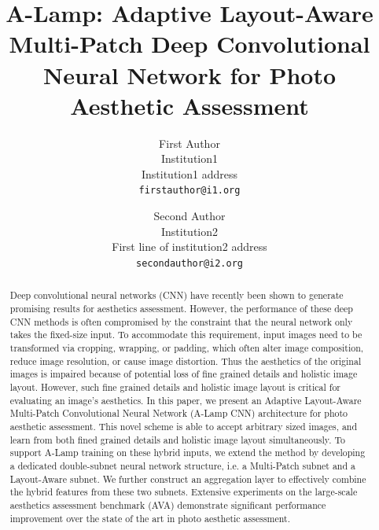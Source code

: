 \documentclass[10pt,twocolumn,letterpaper]{article}
\begin{document}
\title{A-Lamp: Adaptive Layout-Aware Multi-Patch Deep Convolutional Neural Network for Photo Aesthetic Assessment}

\author{First Author\\
Institution1\\
Institution1 address\\
{\tt\small firstauthor@i1.org}
\and
Second Author\\
Institution2\\
First line of institution2 address\\
{\tt\small secondauthor@i2.org}
}

\maketitle
\begin{abstract}	
		
Deep convolutional neural networks (CNN) have recently been shown to generate promising results for aesthetics assessment. However, the performance of these deep CNN methods is often compromised by the constraint that the neural network only takes the fixed-size input. To accommodate this requirement, input images need to be transformed via cropping, wrapping, or padding, which often alter image composition, reduce image resolution, or cause image distortion. Thus the aesthetics of the original images is impaired because of potential loss of fine grained details and holistic image layout. However, such fine grained details and holistic image layout is critical for evaluating an image’s aesthetics. 
In this paper, we present an Adaptive Layout-Aware Multi-Patch Convolutional Neural Network (A-Lamp CNN) architecture for photo aesthetic assessment. This novel scheme is able to accept arbitrary sized images, and learn from both fined grained details and holistic image layout simultaneously. To support A-Lamp training on these hybrid inputs, we extend the method by developing a dedicated double-subnet neural network structure, i.e. a Multi-Patch subnet and a Layout-Aware subnet. We further construct an aggregation layer to effectively combine the hybrid features from these two subnets. Extensive experiments on the large-scale aesthetics assessment benchmark (AVA) demonstrate significant performance improvement over the state of the art in photo aesthetic assessment.

\end{abstract}
\end{document}
